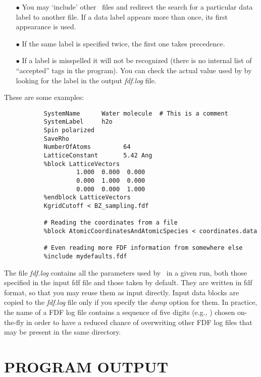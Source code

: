 \begin{itemize}
\item[$\bullet$] You may `include' other \fdflib\ files and redirect the search
for a particular data label to another file.
If a data label appears more than once, its first appearance
is used.

\item[$\bullet$] If the same label is specified twice, the first one takes precedence.

\item[$\bullet$] If a label is misspelled it will not be recognized (there is no
  internal list of ``accepted'' tags in the program). You can check 
  the actual value used by \siesta by looking for the label in the
  output \textit{fdf.log} file.

\end{itemize}

\noindent
These are some examples:

\begin{verbatim}
           SystemName      Water molecule  # This is a comment
           SystemLabel     h2o
           Spin polarized
           SaveRho
           NumberOfAtoms         64
           LatticeConstant       5.42 Ang
           %block LatticeVectors
                    1.000  0.000  0.000
                    0.000  1.000  0.000
                    0.000  0.000  1.000
           %endblock LatticeVectors
           KgridCutoff < BZ_sampling.fdf

           # Reading the coordinates from a file
           %block AtomicCoordinatesAndAtomicSpecies < coordinates.data

           # Even reading more FDF information from somewhere else
           %include mydefaults.fdf
\end{verbatim}

The file \textit{fdf.log} contains all the parameters used by \siesta\
in a given run, both those specified in the input fdf file and
those taken by default. They are written in fdf format, so that
you may reuse them as input directly. Input data blocks are
copied to the \textit{fdf.log} file only if you specify the \textit{dump} option
for them.
In practice, the name of a FDF log file contains a sequence of five
digits (e.g., \shell{fdf-12345.log}) chosen on-the-fly
in order to have a reduced chance of overwriting other FDF log files
that may be present in the same directory.

\section{PROGRAM OUTPUT}

